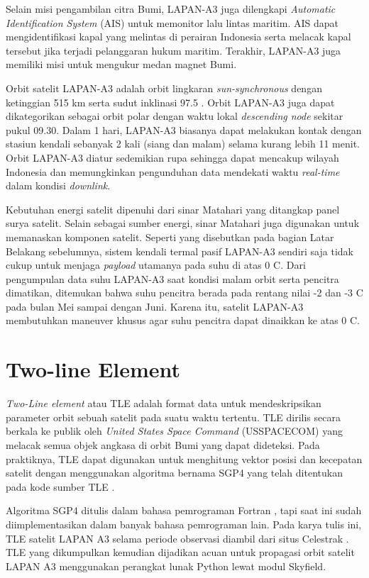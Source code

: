 Selain misi pengambilan citra Bumi, LAPAN-A3 juga dilengkapi \textit{Automatic
Identification System} (AIS) untuk memonitor lalu lintas maritim. AIS dapat
mengidentifikasi kapal yang melintas di perairan Indonesia serta melacak kapal
tersebut jika terjadi pelanggaran hukum maritim. Terakhir, LAPAN-A3 juga
memiliki misi untuk mengukur medan magnet Bumi.

Orbit satelit LAPAN-A3 adalah orbit lingkaran \textit{sun-synchronous} dengan
ketinggian 515 km serta sudut inklinasi 97.5 \degree. Orbit LAPAN-A3 juga dapat
dikategorikan sebagai orbit polar dengan waktu lokal \textit{descending node}
sekitar pukul 09.30. Dalam 1 hari, LAPAN-A3 biasanya dapat melakukan kontak
dengan stasiun kendali sebanyak 2 kali (siang dan malam) selama kurang lebih 11
menit. Orbit LAPAN-A3 diatur sedemikian rupa sehingga dapat mencakup wilayah
Indonesia dan memungkinkan pengunduhan data mendekati waktu \textit{real-time}
dalam kondisi \textit{downlink}.

Kebutuhan energi satelit dipenuhi dari sinar Matahari yang ditangkap panel
surya satelit. Selain sebagai sumber energi, sinar Matahari juga digunakan
untuk memanaskan komponen satelit. Seperti yang disebutkan pada bagian Latar
Belakang sebelumnya, sistem kendali termal pasif LAPAN-A3 sendiri saja tidak
cukup untuk menjaga \textit{payload} utamanya pada suhu di atas 0 \degree C.
Dari pengumpulan data suhu LAPAN-A3 saat kondisi malam orbit serta pencitra
dimatikan, ditemukan bahwa suhu pencitra berada pada rentang nilai -2 dan -3
\degree C pada bulan Mei sampai dengan Juni. Karena itu, satelit LAPAN-A3
membutuhkan maneuver khusus agar suhu pencitra dapat dinaikkan ke atas 0
\degree C.

\section{Two-line Element}

\textit{Two-Line element} atau TLE adalah format data untuk mendeskripsikan
parameter orbit sebuah satelit pada suatu waktu tertentu. TLE dirilis secara
berkala ke publik oleh \textit{United States Space Command} (USSPACECOM) yang
melacak semua objek angkasa di orbit Bumi yang dapat dideteksi. Pada
praktiknya, TLE dapat digunakan untuk menghitung vektor posisi dan kecepatan
satelit dengan menggunakan algoritma bernama SGP4 yang telah ditentukan pada
kode sumber TLE \cite{vallado2008}.

Algoritma SGP4 ditulis dalam bahasa pemrograman Fortran \cite{vallado2006},
tapi saat ini sudah diimplementasikan dalam banyak bahasa pemrograman lain.
Pada karya tulis ini, TLE satelit LAPAN A3 selama periode observasi diambil
dari situs Celestrak \cite{kelso}. TLE yang dikumpulkan kemudian
dijadikan acuan untuk propagasi orbit satelit LAPAN A3 menggunakan perangkat
lunak Python lewat modul Skyfield.

